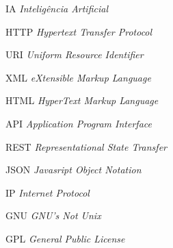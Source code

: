\begin{siglas}
    \item[IA]{\textit{Inteligência Artificial}}

    \item[HTTP]{\textit{Hypertext Transfer Protocol}}

    \item[URI]{\textit{Uniform Resource Identifier}}

    \item[XML]{\textit{eXtensible Markup Language}}

    \item[HTML]{\textit{HyperText Markup Language}}

    \item[API]{\textit{Application Program Interface}}

    \item[REST]{\textit{Representational State Transfer}}

    \item[JSON]{\textit{Javasript Object Notation}}

    \item[IP]{\textit{Internet Protocol}}

    \item[GNU]{\textit{GNU's Not Unix}}

    \item[GPL]{\textit{General Public License}}
\end{siglas}